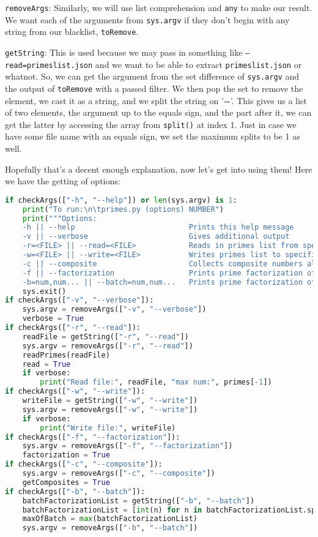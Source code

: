 \documentclass[11pt, twoside, reqno]{book}
\begin{document}
\texttt{removeArgs}: Similarly, we will use list comprehension and \texttt{any} to make our result. We want each of the arguments from \texttt{sys.argv} if they don't begin with any string from our blacklist, \texttt{toRemove}.

\texttt{getString}: This is used because we may pass in something like \texttt{--read=primeslist.json} and we want to be able to extract \texttt{primeslist.json} or whatnot. So, we can get the argument from the set difference of \texttt{sys.argv} and the output of \texttt{toRemove} with a passed filter. We then pop the set to remove the element, we cast it as a string, and we split the string on '='. This gives us a list of two elements, the argument up to the equals sign, and the part after it, we can get the latter by accessing the array from \texttt{split()} at index 1. Just in case we have some file name with an equals sign, we set the maximum splits to be 1 as well.

Hopefully that's a decent enough explanation, now let's get into using them! Here we have the getting of options:
\begin{lstlisting}[language=Python]
if checkArgs(["-h", "--help"]) or len(sys.argv) is 1:
    print("To run:\n\tprimes.py (options) NUMBER")
    print("""Options:
    -h || --help                          Prints this help message
    -v || --verbose                       Gives additional output
    -r=<FILE> || --read=<FILE>            Reads in primes list from specified file (JSON)
    -w=<FILE> || --write=<FILE>           Writes primes list to specified file (JSON)
    -c || --composite                     Collects composite numbers also
    -f || --factorization                 Prints prime factorization of NUMBER
    -b=num,num... || --batch=num,num...   Prints prime factorization of num,num,num...""")
    sys.exit()
if checkArgs(["-v", "--verbose"]):
    sys.argv = removeArgs(["-v", "--verbose"])
    verbose = True
if checkArgs(["-r", "--read"]):
    readFile = getString(["-r", "--read"])
    sys.argv = removeArgs(["-r", "--read"])
    readPrimes(readFile)
    read = True
    if verbose:
        print("Read file:", readFile, "max num:", primes[-1])
if checkArgs(["-w", "--write"]):
    writeFile = getString(["-w", "--write"])
    sys.argv = removeArgs(["-w", "--write"])
    if verbose:
        print("Write file:", writeFile)
if checkArgs(["-f", "--factorization"]):
    sys.argv = removeArgs(["-f", "--factorization"])
    factorization = True
if checkArgs(["-c", "--composite"]):
    sys.argv = removeArgs(["-c", "--composite"])
    getComposites = True
if checkArgs(["-b", "--batch"]):
    batchFactorizationList = getString(["-b", "--batch"])
    batchFactorizationList = [int(n) for n in batchFactorizationList.split(",")]
    maxOfBatch = max(batchFactorizationList)
    sys.argv = removeArgs(["-b", "--batch"])
\end{lstlisting}
\end{document}
